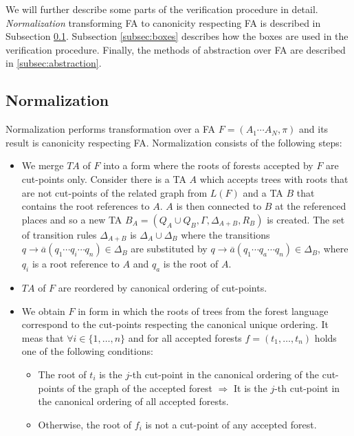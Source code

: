 We will further describe some parts of the verification procedure in detail.
\emph{Normalization} transforming FA to canonicity respecting FA is described in Subsection \ref{subsec:norm}.
Subsection \ref{subsec:boxes} describes how the boxes are used in the verification procedure.
Finally, the methods of abstraction over FA are described in \ref{subsec:abstraction}.

\subsection{Normalization}
\label{subsec:norm}

Normalization performs transformation over a FA $F = (A_1 \cdots A_N,\pi)$ and its result is canonicity respecting FA.
Normalization consists of the following steps:
\begin{itemize}
		\item We merge $TA$ of $F$ into a form where the roots of forests accepted by $F$ are cut-points only.
			Consider there is a TA $A$ which accepts trees with roots
			that are not cut-points of the related graph from $L(F)$ and a TA $B$ that contains
			the root references to $A$.
			$A$ is then connected to $B$ at the referenced places and so a new
			TA $B_A = (Q_A \cup Q_B, \Gamma, \Delta_{A+B}, R_B)$ is created.
			The set of transition rules $\Delta_{A+B}$ is $\Delta_A \cup \Delta_B$ where
			the transitions $q \rightarrow  \overline{a} (q_1 \cdots q_i \cdots q_n) \in \Delta_B$ are
			substituted by $q \rightarrow  \overline{a} (q_1 \cdots q_a \cdots q_n) \in \Delta_B$,
			where $q_i$ is a root reference to $A$ and $q_a$ is the root of $A$. 
		\item $TA$ of $F$ are reordered by canonical ordering of cut-points.
		\item We obtain $F$ in form in which the roots of trees from the forest language 
			correspond to the cut-points respecting the canonical unique ordering.
			It meas that $\forall i \in \{1,\ldots,n\}$ and for all accepted forests $f=(t_1,\ldots,t_n)$ holds
			one of the following conditions:
			\begin{itemize}
				\item The root of $t_i$ is the $j$-th cut-point in the canonical ordering of the cut-points
					of the graph of the accepted forest $\Rightarrow$
					It is the $j$-th cut-point in the canonical ordering of all accepted forests.
				\item Otherwise, the root of $f_i$ is not a cut-point of any accepted forest.
			\end{itemize}
\end{itemize}

